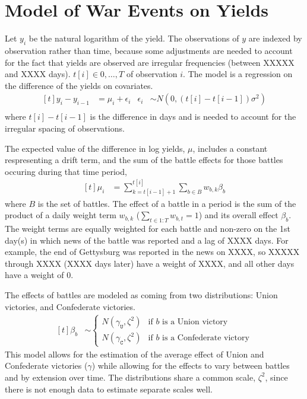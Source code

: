 \section{Model of War Events on Yields}
\label{bonds_battles:sec:model-war-events}

Let $y_{i}$ be the natural logarithm of the yield.
The observations of $y$ are indexed by observation rather than time, because some adjustments are needed to account for the fact that yields are observed are irregular frequencies (between XXXXX and XXXX days).
$t[i] \in 0, \dots, T$ of observation $i$.
The model is a regression on the difference of the yields on covariates.
\begin{equation}
  \label{bonds_battles:eq:1}
  \begin{aligned}[t]
    y_{i} - y_{i - 1} &= \mu_{i} + \epsilon_{i} & \epsilon_{i} & \sim N(0, (t[i] - t[i - 1]) \sigma^{2}) \\
  \end{aligned}
\end{equation}
where $t[i] - t[i - 1]$ is the difference in days and is needed to account for the irregular spacing of observations.

The expected value of the difference in log yields, $\mu$, includes a constant respresenting a drift term, and the sum of the battle effects for those battles occuring during that time period,
\begin{equation}
  \label{bonds_battles:eq:2}
  \begin{aligned}[t]
    \mu_{i} &= \sum_{k = t[i-1] + 1}^{t[i]} \sum_{b \in B} w_{b,k} \beta_{b}
  \end{aligned}
\end{equation}
where $B$ is the set of battles.
The effect of a battle in a period is the sum of the product of a daily weight term $w_{b,k}$ ($\sum_{t \in 1:T} w_{b,t} = 1$) and its overall effect $\beta_{b}$.
The weight terms are equally weighted for each battle and non-zero on the 1st day(s) in which news of the battle was reported and a lag of XXXX days.
For example, the end of Gettysburg was reported in the news on XXXX, so XXXXX through XXXX (XXXX days later) have a weight of XXXX, and all other days have a weight of 0.

The effects of battles are modeled as coming from two distributions: Union victories, and Confederate victories.
\begin{equation}
  \label{bonds_battles:eq:4}
  \begin{aligned}[t]
  \beta_{b} &\sim
  \begin{cases}
    N(\gamma_{\mathtt{U}}, \zeta^{2}) & \text{if $b$ is a Union victory} \\
    N(\gamma_{\mathtt{C}}, \zeta^{2}) & \text{if $b$ is a Confederate victory}
  \end{cases}
  \end{aligned}
\end{equation}
This model allows for the estimation of the average effect of Union and Confederate victories ($\gamma$) while allowing for the effects to vary between battles and by extension over time.
The distributions share a common scale, $\zeta^{2}$, since there is not enough data to estimate separate scales well.

